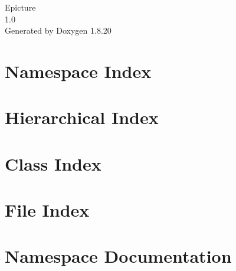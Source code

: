 \let\mypdfximage\pdfximage\def\pdfximage{\immediate\mypdfximage}\documentclass[twoside]{book}
\newcommand{\+}{\discretionary{\mbox{\scriptsize$\hookleftarrow$}}{}{}}
\newcommand{\clearemptydoublepage}{%
  \newpage{\pagestyle{empty}\cleardoublepage}%
}
\begin{document}
\hypersetup{pageanchor=false,
             bookmarksnumbered=true,
             pdfencoding=unicode
            }
\begin{titlepage}
\vspace*{7cm}
\begin{center}%
{\Large Epicture \\[1ex]\large 1.\+0 }\\
\vspace*{1cm}
{\large Generated by Doxygen 1.8.20}\\
\end{center}
\end{titlepage}
\clearemptydoublepage
{}
\tableofcontents
\clearemptydoublepage
{}
\hypersetup{pageanchor=true}

\chapter{Namespace Index}

\chapter{Hierarchical Index}

\chapter{Class Index}

\chapter{File Index}

\chapter{Namespace Documentation}














\end{document}
